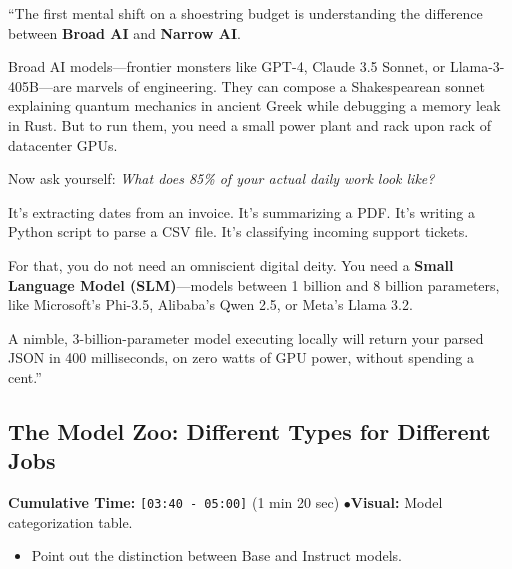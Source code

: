 \documentclass[11pt,a4paper]{article}
\begin{document}
\begin{speechbox}
``The first mental shift on a shoestring budget is understanding the difference between \textbf{Broad AI} and \textbf{Narrow AI}.

Broad AI models---frontier monsters like GPT-4, Claude 3.5 Sonnet, or Llama-3-405B---are marvels of engineering. They can compose a Shakespearean sonnet explaining quantum mechanics in ancient Greek while debugging a memory leak in Rust. But to run them, you need a small power plant and rack upon rack of datacenter GPUs.

Now ask yourself: \textit{What does 85\% of your actual daily work look like?}

It's extracting dates from an invoice. It's summarizing a PDF. It's writing a Python script to parse a CSV file. It's classifying incoming support tickets.

For that, you do not need an omniscient digital deity. You need a \textbf{Small Language Model (SLM)}---models between 1 billion and 8 billion parameters, like Microsoft's Phi-3.5, Alibaba's Qwen 2.5, or Meta's Llama 3.2.

A nimble, 3-billion-parameter model executing locally will return your parsed JSON in 400 milliseconds, on zero watts of GPU power, without spending a cent.''
\end{speechbox}

\subsection{The Model Zoo: Different Types for Different Jobs}
\begin{directionbox}
    \textbf{Cumulative Time:} \texttt{[03:40 - 05:00]} (1 min 20 sec) \quad$\bullet$\quad \textbf{Visual:} Model categorization table.
    \begin{itemize}
        \item Point out the distinction between Base and Instruct models.
    \end{itemize}
\end{directionbox}
\end{document}
